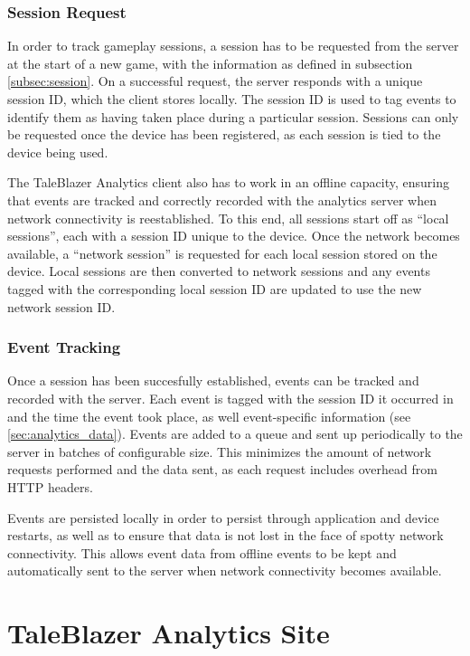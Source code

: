 \subsubsection{Session Request}

In order to track gameplay sessions, a session has to be requested from the server at the start of a new game, with the information as defined in subsection \ref{subsec:session}. On a successful request, the server responds with a unique session ID, which the client stores locally. The session ID is used to tag events to identify them as having taken place during a particular session. Sessions can only be requested once the device has been registered, as each session is tied to the device being used.

The TaleBlazer Analytics client also has to work in an offline capacity, ensuring that events are tracked and correctly recorded with the analytics server when network connectivity is reestablished. To this end, all sessions start off as ``local sessions'', each with a session ID unique to the device. Once the network becomes available, a ``network session'' is requested for each local session stored on the device. Local sessions are then converted to network sessions and any events tagged with the corresponding local session ID are updated to use the new network session ID. 

\subsubsection{Event Tracking}
Once a session has been succesfully established, events can be tracked and recorded with the server. Each event is tagged with the session ID it occurred in and the time the event took place, as well event-specific information (see \ref{sec:analytics_data}). Events are added to a queue and sent up periodically to the server in batches of configurable size. This minimizes the amount of network requests performed and the data sent, as each request includes overhead from HTTP headers. 

Events are persisted locally in order to persist through application and device restarts, as well as to ensure that data is not lost in the face of spotty network connectivity. This allows event data from offline events to be kept and automatically sent to the server when network connectivity becomes available.

\section{TaleBlazer Analytics Site}

